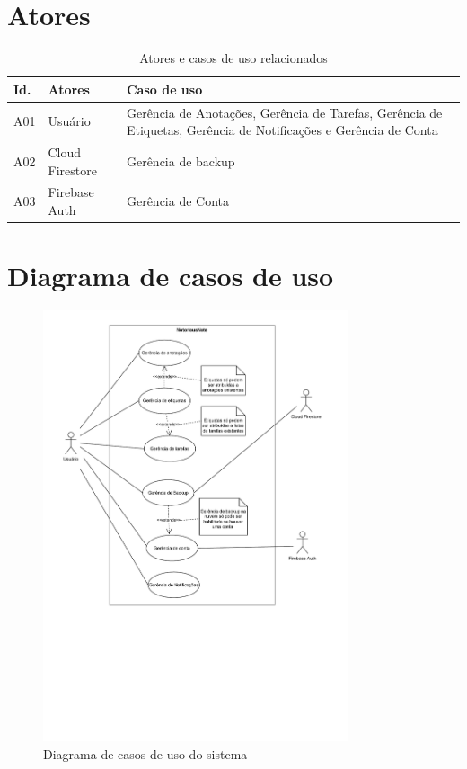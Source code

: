 \documentclass[
	12pt,				%
	oneside,			%
	a4paper,			%
	english,			%
	brazil,				%
	]{abntex2}
\begin{document}
\section{Atores}
\IBGEtabfontsize
\begin{longtable}{@{}p{}p{}p{}@{}}
\caption{Atores e casos de uso relacionados}
\label{tab:atores} \\
\toprule
\textbf{Id.} & \textbf{Atores} & \textbf{Caso de uso} \\ \midrule
A01 & Usuário & Gerência de Anotações, Gerência de Tarefas, Gerência de Etiquetas, Gerência de Notificações e Gerência de Conta\\ \midrule
A02 & Cloud Firestore & Gerência de backup\\ \midrule
A03 & Firebase Auth & Gerência de Conta \\ \bottomrule
\end{longtable}

\section{Diagrama de casos de uso}
\begin{figure}[htb]
    \centering
    \includegraphics[keepaspectratio=true,width=0.8\textwidth,clip=true,trim=1cm 9cm 1cm 1cm]{notoriousnote-casos-de-uso.pdf}
    \caption{Diagrama de casos de uso do sistema}
    \label{fig:diagrama_casos_uso}
\end{figure}
\end{document}
